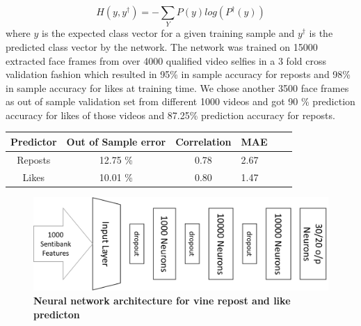 $${H(y,y^{\dagger}) =  - \sum_{Y} {P(y) log(P^{\dagger}(y))} }$$
where $y$ is the expected class vector for a given training sample and $y^{\dagger}$ is the predicted class vector by the network. The network was trained on 15000 extracted face frames from over 4000 qualified video selfies in a 3 fold cross validation fashion which resulted in 95\% in sample accuracy for reposts and 98\% in sample accuracy for likes at training time. We chose another 3500 face frames as out of sample validation set from different 1000 videos and got 90 \% prediction accuracy for likes of those videos and 87.25\% prediction accuracy for reposts.

\par
\begin{center}
\begin{tabular}{ |c|c|clcl } 
 \hline
 Predictor & Out of Sample error & Correlation &  MAE \\ 
 \hline
 Reposts & 12.75 \% & 0.78 & 2.67 \\ 
 Likes & 10.01 \% & 0.80 & 1.47 \\ 
 \hline
\end{tabular}
\end{center}
\par


\begin{figure}
\centering
\includegraphics[width=\columnwidth]{figures/NN_diag}
\caption{\textbf{ Neural network architecture for vine repost and like predicton }}
\label{fig:NN_diag}
\end{figure}






